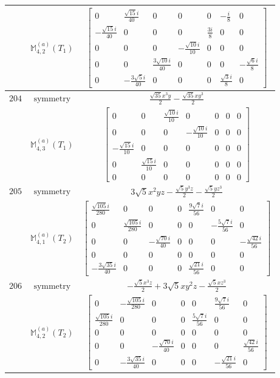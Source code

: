 \documentclass[fleqn,8pt,landscape]{jsarticle}
\begin{document}
\begin{longtable}{ccc}
$  $ & $ \mathbb{M}_{4,2}^{(a)}(T_{1}) $ & $ \begin{bmatrix} 0 & \frac{\sqrt{15} i}{40} & 0 & 0 & 0 & - \frac{i}{8} & 0 \\ - \frac{\sqrt{15} i}{40} & 0 & 0 & 0 & \frac{3 i}{8} & 0 & 0 \\ 0 & 0 & 0 & - \frac{\sqrt{10} i}{10} & 0 & 0 & 0 \\ 0 & 0 & \frac{3 \sqrt{10} i}{40} & 0 & 0 & 0 & - \frac{\sqrt{6} i}{8} \\ 0 & - \frac{3 \sqrt{5} i}{40} & 0 & 0 & 0 & \frac{\sqrt{3} i}{8} & 0 \end{bmatrix} $ \\ \hline
$ 204 $ & $ \text{symmetry} $ & $ \frac{\sqrt{35} x^{3} y}{2} - \frac{\sqrt{35} x y^{3}}{2} $ \\
$  $ & $ \mathbb{M}_{4,3}^{(a)}(T_{1}) $ & $ \begin{bmatrix} 0 & 0 & \frac{\sqrt{10} i}{10} & 0 & 0 & 0 & 0 \\ 0 & 0 & 0 & - \frac{\sqrt{10} i}{10} & 0 & 0 & 0 \\ - \frac{\sqrt{15} i}{10} & 0 & 0 & 0 & 0 & 0 & 0 \\ 0 & \frac{\sqrt{15} i}{10} & 0 & 0 & 0 & 0 & 0 \\ 0 & 0 & 0 & 0 & 0 & 0 & 0 \end{bmatrix} $ \\ \hline
$ 205 $ & $ \text{symmetry} $ & $ 3 \sqrt{5} x^{2} y z - \frac{\sqrt{5} y^{3} z}{2} - \frac{\sqrt{5} y z^{3}}{2} $ \\
$  $ & $ \mathbb{M}_{4,1}^{(a)}(T_{2}) $ & $ \begin{bmatrix} \frac{\sqrt{105} i}{280} & 0 & 0 & 0 & \frac{9 \sqrt{7} i}{56} & 0 & 0 \\ 0 & \frac{\sqrt{105} i}{280} & 0 & 0 & 0 & - \frac{5 \sqrt{7} i}{56} & 0 \\ 0 & 0 & - \frac{\sqrt{70} i}{40} & 0 & 0 & 0 & - \frac{\sqrt{42} i}{56} \\ 0 & 0 & 0 & 0 & 0 & 0 & 0 \\ - \frac{3 \sqrt{35} i}{40} & 0 & 0 & 0 & \frac{\sqrt{21} i}{56} & 0 & 0 \end{bmatrix} $ \\ \hline
$ 206 $ & $ \text{symmetry} $ & $ - \frac{\sqrt{5} x^{3} z}{2} + 3 \sqrt{5} x y^{2} z - \frac{\sqrt{5} x z^{3}}{2} $ \\
$  $ & $ \mathbb{M}_{4,2}^{(a)}(T_{2}) $ & $ \begin{bmatrix} 0 & - \frac{\sqrt{105} i}{280} & 0 & 0 & 0 & \frac{9 \sqrt{7} i}{56} & 0 \\ \frac{\sqrt{105} i}{280} & 0 & 0 & 0 & \frac{5 \sqrt{7} i}{56} & 0 & 0 \\ 0 & 0 & 0 & 0 & 0 & 0 & 0 \\ 0 & 0 & - \frac{\sqrt{70} i}{40} & 0 & 0 & 0 & \frac{\sqrt{42} i}{56} \\ 0 & - \frac{3 \sqrt{35} i}{40} & 0 & 0 & 0 & - \frac{\sqrt{21} i}{56} & 0 \end{bmatrix} $ \\ \hline

\end{longtable}
\end{document}

